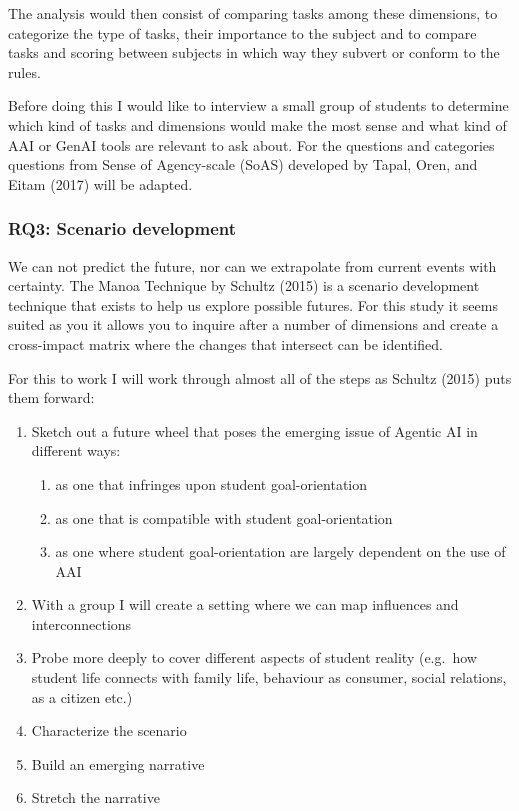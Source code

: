 \documentclass[
  letterpaper,
  DIV=11,
  numbers=noendperiod]{scrartcl}
\providecommand{\tightlist}{%
  \setlength{\itemsep}{0pt}\setlength{\parskip}{0pt}}
\begin{document}
The analysis would then consist of comparing tasks among these
dimensions, to categorize the type of tasks, their importance to the
subject and to compare tasks and scoring between subjects in which way
they subvert or conform to the rules.

Before doing this I would like to interview a small group of students to
determine which kind of tasks and dimensions would make the most sense
and what kind of AAI or GenAI tools are relevant to ask about. For the
questions and categories questions from Sense of Agency-scale (SoAS)
developed by Tapal, Oren, and Eitam (2017) will be adapted.

\subsubsection{RQ3: Scenario
development}\label{rq3-scenario-development}

We can not predict the future, nor can we extrapolate from current
events with certainty. The Manoa Technique by Schultz (2015) is a
scenario development technique that exists to help us explore possible
futures. For this study it seems suited as you it allows you to inquire
after a number of dimensions and create a cross-impact matrix where the
changes that intersect can be identified.

For this to work I will work through almost all of the steps as Schultz
(2015) puts them forward:

\begin{enumerate}
\def\labelenumi{\arabic{enumi}.}
\tightlist
\item
  Sketch out a future wheel that poses the emerging issue of Agentic AI
  in different ways:

  \begin{enumerate}
  \def\labelenumii{\arabic{enumii}.}
  \tightlist
  \item
    as one that infringes upon student goal-orientation
  \item
    as one that is compatible with student goal-orientation
  \item
    as one where student goal-orientation are largely dependent on the
    use of AAI
  \end{enumerate}
\item
  With a group I will create a setting where we can map influences and
  interconnections
\item
  Probe more deeply to cover different aspects of student reality
  (e.g.~how student life connects with family life, behaviour as
  consumer, social relations, as a citizen etc.)
\item
  Characterize the scenario
\item
  Build an emerging narrative
\item
  Stretch the narrative
\end{enumerate}
\end{document}
